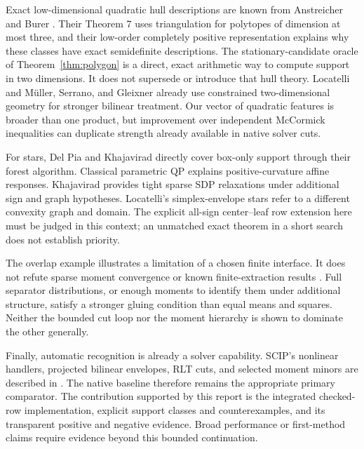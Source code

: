 Exact low-dimensional quadratic hull descriptions are known from
Anstreicher and Burer \cite{AnstreicherBurer2010}. Their Theorem 7
uses triangulation for polytopes of dimension at most three, and
their low-order completely positive representation explains why these
classes have exact semidefinite descriptions. The stationary-candidate
oracle of Theorem~\ref{thm:polygon} is a direct, exact arithmetic way
to compute support in two dimensions. It does not supersede or
introduce that hull theory. Locatelli \cite{Locatelli2018} and
M\"uller, Serrano, and Gleixner \cite{MullerSerranoGleixner2020}
already use constrained two-dimensional geometry for stronger
bilinear treatment. Our vector of quadratic features is broader than
one product, but improvement over independent McCormick inequalities
can duplicate strength already available in native solver cuts.

For stars, Del Pia and Khajavirad
\cite{DelPiaKhajavirad2026} directly cover box-only support through
their forest algorithm. Classical parametric QP
\cite{BemporadEtAl2002} explains positive-curvature affine responses.
Khajavirad \cite{Khajavirad2026} provides tight sparse SDP
relaxations under additional sign and graph hypotheses. Locatelli's
simplex-envelope stars \cite{Locatelli2015} refer to a different
convexity graph and domain. The explicit all-sign center--leaf row
extension here must be judged in this context; an unmatched exact
theorem in a short search does not establish priority.

The overlap example illustrates a limitation of a chosen finite
interface. It does not refute sparse moment convergence or known
finite-extraction results \cite{Lasserre2001,Lasserre2006}. Full
separator distributions, or enough moments to identify them under
additional structure, satisfy a stronger gluing condition than equal
means and squares. Neither the bounded cut loop nor the moment
hierarchy is shown to dominate the other generally.

Finally, automatic recognition is already a solver capability.
SCIP's nonlinear handlers, projected bilinear envelopes, RLT cuts,
and selected moment minors are described in
\cite{BestuzhevaEtAl2025}. The native baseline therefore remains the
appropriate primary comparator. The contribution supported by this
report is the integrated checked-row implementation, explicit support
classes and counterexamples, and its transparent positive and negative
evidence. Broad performance or first-method claims require evidence
beyond this bounded continuation.
